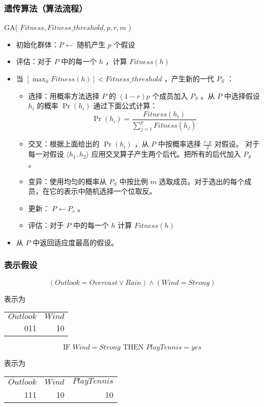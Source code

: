 \documentclass{beamer}
\begin{document}
\begin{frame}
\frametitle{遗传算法（算法流程）}
\label{sec-3-3}

GA( $Fitness, Fitness\_threshold, p, r, m$ )
\begin{itemize}
\item 初始化群体：$P \leftarrow$  随机产生 $p$ 个假设
\item 评估：对于 $P$ 中的每一个 $h$ ，计算 $Fitness(h)$
\item 当 $[\max_{h}Fitness(h)] < Fitness\_threshold$ ，产生新的一代 $P_S$ ：
\begin{itemize}
\item 选择：用概率方法选择 $P$ 的 $(1-r)p$ 个成员加入 $P_S$ 。从 $P$ 中选择假设 $h_i$ 的概率 $\Pr(h_i)$ 通过下面公式计算：
          $$\Pr(h_{i}) = \frac{Fitness(h_{i})}{\sum_{j=1}^{p} Fitness(h_{j})}$$
\item 交叉：根据上面给出的 $\Pr(h_i)$ ，从 $P$ 中按概率选择 $\frac{r \cdot p}{2}$ 对假设。
         对于每一对假设 $\langle h_{1}, h_{2} \rangle$ 应用交叉算子产生两个后代。把所有的后代加入 $P_S$ 。
\item 变异：使用均匀的概率从 $P_S$ 中按比例 $m$ 选取成员。对于选出的每个成员，在它的表示中随机选择一个位取反。
\item 更新： $P \leftarrow P_{s}$ 。
\item 评估：对于 $P$ 中的每一个 $h$ 计算 $Fitness(h)$
\end{itemize}
\item 从 $P$ 中返回适应度最高的假设。
\end{itemize}
\end{frame}
\begin{frame}
\frametitle{表示假设}
\label{sec-3-4}


$$(Outlook = Overcast \lor Rain) \land (Wind = Strong)$$

表示为


\begin{center}
\begin{tabular}{rr}
 $Outlook$  &  $Wind$  \\
       011  &      10  \\
\end{tabular}
\end{center}




$$\mbox{IF\ \ } Wind = Strong \mbox{\ \ \ THEN\ \ } PlayTennis=yes$$

表示为



\begin{center}
\begin{tabular}{rrr}
 $Outlook$  &  $Wind$  &  $PlayTennis$  \\
       111  &      10  &            10  \\
\end{tabular}
\end{center}
\end{frame}
\end{document}
